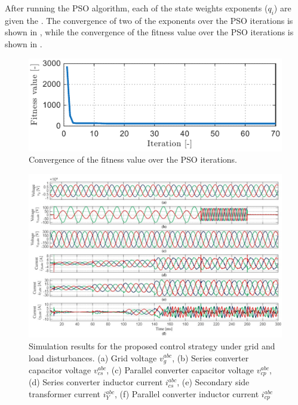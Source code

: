After running the PSO algorithm, each of the state weights exponents ($q_i$) are given the . The convergence of two of the exponents over the PSO iterations is shown in , while the convergence of the fitness value over the PSO iterations is shown in .


\begin{figure}[t!]
    \centering
    \includegraphics[]{Images/Fitness_iterations.pdf}
    \caption{Convergence of the fitness value over the PSO iterations.}
    \label{fig:PSO_Fitness}
\end{figure}

\begin{figure}[t!]
    \centering
    \includegraphics[width=\textwidth]{Images/Simulation_Results.pdf}
    \caption{Simulation results for the proposed control strategy under grid and load disturbances. (a) Grid voltage $v_g^{abc}$, (b) Series converter capacitor voltage $v_{cs}^{abc}$, (c) Parallel converter capacitor voltage $v_{cp}^{abc}$, (d) Series converter inductor current $i_{cs}^{abc}$, (e) Secondary side transformer current $i_Y^{abc}$, (f) Parallel converter inductor current $i_{cp}^{abc}$}
    \label{fig:Sim_results}
\end{figure}